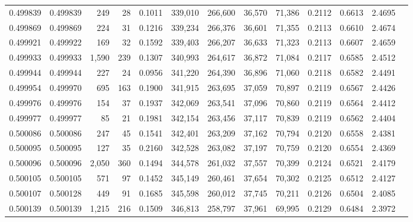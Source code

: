 \begin{tabular}{rrrrrrrrrrrrr}
0.499839 & 0.499839 &   249 &    28 &                                     0.1011 & 339,010 & 266,600 &  36,570 &  71,386 & 0.2112 & 0.6613 & 2.4695 \\
0.499869 & 0.499869 &   224 &    31 &                                     0.1216 & 339,234 & 266,376 &  36,601 &  71,355 & 0.2113 & 0.6610 & 2.4674 \\
0.499921 & 0.499922 &   169 &    32 &                                     0.1592 & 339,403 & 266,207 &  36,633 &  71,323 & 0.2113 & 0.6607 & 2.4659 \\
0.499933 & 0.499933 & 1,590 &   239 &                                     0.1307 & 340,993 & 264,617 &  36,872 &  71,084 & 0.2117 & 0.6585 & 2.4512 \\
0.499944 & 0.499944 &   227 &    24 &                                     0.0956 & 341,220 & 264,390 &  36,896 &  71,060 & 0.2118 & 0.6582 & 2.4491 \\
0.499954 & 0.499970 &   695 &   163 &                                     0.1900 & 341,915 & 263,695 &  37,059 &  70,897 & 0.2119 & 0.6567 & 2.4426 \\
0.499976 & 0.499976 &   154 &    37 &                                     0.1937 & 342,069 & 263,541 &  37,096 &  70,860 & 0.2119 & 0.6564 & 2.4412 \\
0.499977 & 0.499977 &    85 &    21 &                                     0.1981 & 342,154 & 263,456 &  37,117 &  70,839 & 0.2119 & 0.6562 & 2.4404 \\
0.500086 & 0.500086 &   247 &    45 &                                     0.1541 & 342,401 & 263,209 &  37,162 &  70,794 & 0.2120 & 0.6558 & 2.4381 \\
0.500095 & 0.500095 &   127 &    35 &                                     0.2160 & 342,528 & 263,082 &  37,197 &  70,759 & 0.2120 & 0.6554 & 2.4369 \\
0.500096 & 0.500096 & 2,050 &   360 &                                     0.1494 & 344,578 & 261,032 &  37,557 &  70,399 & 0.2124 & 0.6521 & 2.4179 \\
0.500105 & 0.500105 &   571 &    97 &                                     0.1452 & 345,149 & 260,461 &  37,654 &  70,302 & 0.2125 & 0.6512 & 2.4127 \\
0.500107 & 0.500128 &   449 &    91 &                                     0.1685 & 345,598 & 260,012 &  37,745 &  70,211 & 0.2126 & 0.6504 & 2.4085 \\
0.500139 & 0.500139 & 1,215 &   216 &                                     0.1509 & 346,813 & 258,797 &  37,961 &  69,995 & 0.2129 & 0.6484 & 2.3972 \\

\end{tabular}

